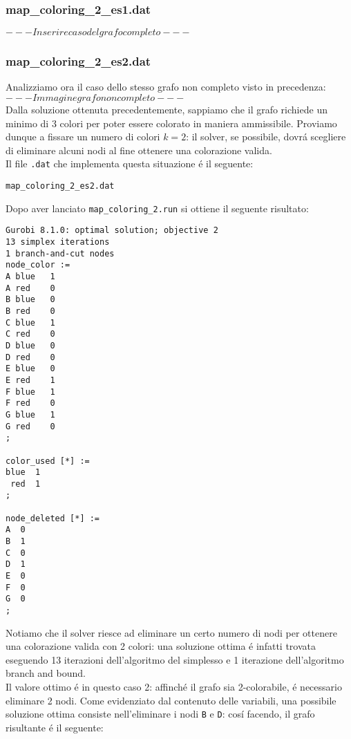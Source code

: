 \documentclass{article}
\begin{document}
\subsubsection{map\_coloring\_2\_es1.dat}
$ --- Inserire caso del grafo completo --- $\\

\subsubsection{map\_coloring\_2\_es2.dat}
Analizziamo ora il caso dello stesso grafo non completo visto in precedenza:\\

$ --- Immagine grafo non completo --- $\\

Dalla soluzione ottenuta precedentemente, sappiamo che il grafo richiede un minimo di 3 colori per poter essere colorato in maniera ammissibile. Proviamo dunque a fissare un numero di colori $k = 2$: il solver, se possibile, dovr\'a scegliere di eliminare alcuni nodi al fine ottenere una colorazione valida.\\

Il file \texttt{.dat} che implementa questa situazione \'e il seguente:

\texttt{map\_coloring\_2\_es2.dat}


Dopo aver lanciato \texttt{map\_coloring\_2.run} si ottiene il seguente risultato:\\

\begin{verbatim}
Gurobi 8.1.0: optimal solution; objective 2
13 simplex iterations
1 branch-and-cut nodes
node_color :=
A blue   1
A red    0
B blue   0
B red    0
C blue   1
C red    0
D blue   0
D red    0
E blue   0
E red    1
F blue   1
F red    0
G blue   1
G red    0
;

color_used [*] :=
blue  1
 red  1
;

node_deleted [*] :=
A  0
B  1
C  0
D  1
E  0
F  0
G  0
;

\end{verbatim}

Notiamo che il solver riesce ad eliminare un certo numero di nodi per ottenere una colorazione valida con 2 colori: una soluzione ottima \'e infatti trovata eseguendo 13 iterazioni dell'algoritmo del simplesso e 1 iterazione dell'algoritmo branch and bound.\\
Il valore ottimo \'e in questo caso 2: affinch\'e il grafo sia 2-colorabile, \'e necessario eliminare 2 nodi. Come evidenziato dal contenuto delle variabili, una possibile soluzione ottima consiste nell'eliminare i nodi \texttt{B} e \texttt{D}: cos\'i facendo, il grafo risultante \'e il seguente:\\
\end{document}
